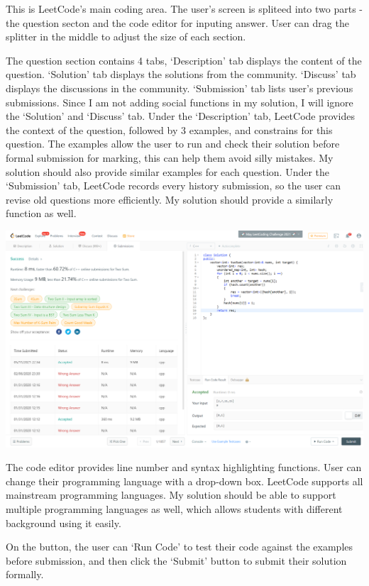 \documentclass[a4paper]{report}
\begin{document}
This is LeetCode's main coding area. The user's screen is spliteed into two parts - the question secton and the code editor for inputing answer. User can drag the splitter in the middle to adjust the size of each section.

The question section contains 4 tabs, `Description' tab displays the content of the question. `Solution' tab displays the solutions from the community. `Discuss' tab displays the discussions in the community. `Submission' tab lists user's previous submissions. Since I am not adding social functions in my solution, I will ignore the `Solution' and `Discuss' tab. Under the `Description' tab, LeetCode provides the context of the question, followed by 3 examples, and constrains for this question. The examples allow the user to run and check their solution before formal submission for marking, this can help them avoid silly mistakes. My solution should also provide similar examples for each question. Under the `Submission' tab, LeetCode records every history submission, so the user can revise old questions more efficiently. My solution should provide a similarly function as well.

\includegraphics[width=\linewidth]{Two-Sum-LeetCode-Submission}

The code editor provides line number and syntax highlighting functions. User can change their programming language with a drop-down box. LeetCode supports all mainstream programming languages. My solution should be able to support multiple programming languages as well, which allows students with different background using it easily.

On the button, the user can `Run Code' to test their code against the examples before submission, and then click the `Submit' button to submit their solution formally.
\end{document}
